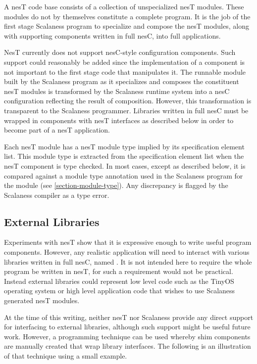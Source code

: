 A nesT code base consists of a collection of unspecialized nesT modules. These modules do not by
themselves constitute a complete program. It is the job of the first stage Scalaness program to
specialize and compose the nesT modules, along with supporting components written in full nesC,
into full applications.


NesT currently does not support nesC-style configuration components. Such support could
reasonably be added since the implementation of a component is not important to the first stage
code that manipulates it. The runnable module built by the Scalaness program as it specializes
and composes the constituent nesT modules is transformed by the Scalaness runtime system into a
nesC configuration reflecting the result of composition. However, this transformation is
transparent to the Scalaness programmer. Libraries written in full nesC must be wrapped in
components with nesT interfaces as described below in order to become part of a nesT
application.

Each nesT module has a nesT module type implied by its specification element list. This module
type is extracted from the specification element list when the nesT component is type checked.
In most cases, except as described below, it is compared against a module type annotation used
in the Scalaness program for the module (see \autoref{section-module-type}). Any discrepancy is
flagged by the Scalaness compiler as a type error.

\subsection{External Libraries}
\label{section-external-libraries}

Experiments with nesT show that it is expressive enough to write useful program components.
However, any realistic application will need to interact with various libraries written in full
nesC, named . It is not intended here to require the whole
program be written in nesT, for such a requirement would not be practical. Instead external
libraries could represent low level code such as the TinyOS operating system or high level
application code that wishes to use Scalaness generated nesT modules.

At the time of this writing, neither nesT nor Scalaness provide any direct support for
interfacing to external libraries, although such support might be useful future work. However, a
programming technique can be used whereby shim components are manually created that wrap library
interfaces. The following is an illustration of that technique using a small example.

